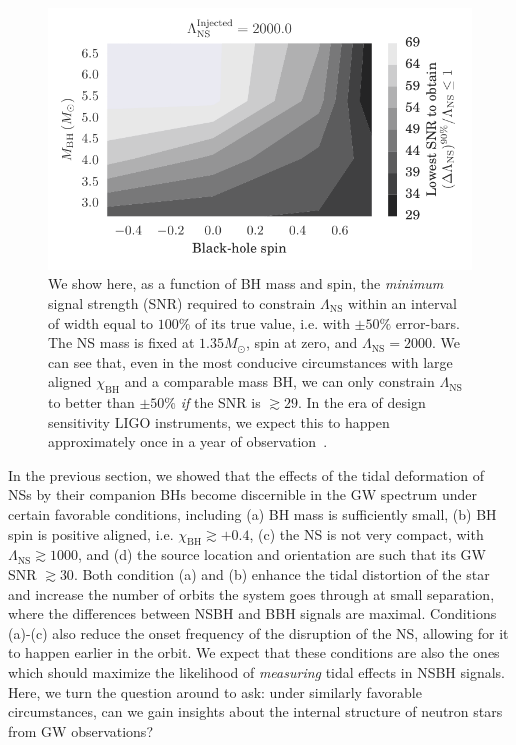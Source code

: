 \documentclass[aps,prd,amsmath,floats,floatfix, twocolumn,
superscriptaddress,nofootinbib,showpacs]{revtex4-1}
\newcommand{\lambdans}{\Lambda_\mathrm{NS}}
\newcommand{\chibh}{\chi_\mathrm{BH}}
\begin{document}
\begin{figure}
\centering    
\includegraphics[trim=10 10 0 10 0,clip=true,width=1.05\columnwidth]{TTSNRThresholdFor100LambdaMeasurement_BHspin_BHmass_Lambda2000_0_CI90_0}
\caption{
We show here, as a function of BH mass and spin, the {\it minimum} signal
strength (SNR) required to constrain $\lambdans$ within an interval of width
equal to $100\%$ of its true value, i.e. with $\pm 50\%$ error-bars. The NS mass
is fixed at $1.35M_\odot$, spin at zero, and $\lambdans=2000$.
% 
We can see that, even in the most conducive circumstances with large aligned 
$\chibh$ and a comparable mass BH, we can only constrain $\lambdans$ to better
than $\pm 50\%$ {\it if} the SNR is $\gtrsim 29$. In the era of design
sensitivity LIGO instruments, we expect this to happen approximately once in a
year of observation~\cite{Abadie:2010cfa}.
}
\label{fig:TT_SNRThresholds_BHspin_BHmass_CI90_0}
\end{figure}

%

In the previous section, we showed that the effects of the tidal deformation of
NSs by their companion BHs become discernible in
the GW spectrum under certain favorable conditions, including (a) BH mass is
sufficiently small, (b) BH spin is positive aligned, i.e. $\chibh\gtrsim +0.4$,
(c) the NS is not very compact, with $\lambdans\gtrsim 1000$, and (d) the
source location and orientation are such that its GW SNR $\gtrsim 30$.
% 
Both condition (a) and (b) enhance the tidal distortion of the star and increase
the number of orbits the system goes through at small separation, where the
differences between NSBH and BBH signals are maximal.
% 
Conditions (a)-(c) also reduce the onset frequency of the disruption of the NS,
allowing for it to happen earlier in the orbit. 
% 
We expect that these conditions are also the ones which should maximize the
likelihood of {\it measuring} tidal effects in NSBH signals. Here,
%
%
we turn the question around to ask: under similarly favorable circumstances,
can we gain insights about the internal structure of neutron stars from GW
observations?
\end{document}
